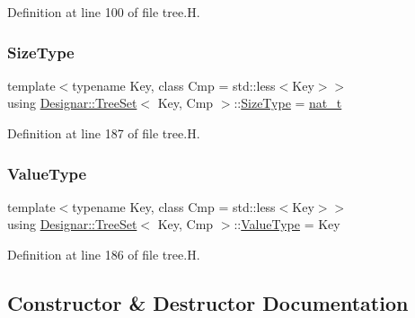 Definition at line 100 of file tree.\+H.

\mbox{\label{class_designar_1_1_tree_set_a9a4926aa5faab169012a173c8cf5e4bb}} 
\subsubsection{\texorpdfstring{Size\+Type}{SizeType}}
{\footnotesize\ttfamily template$<$typename Key, class Cmp = std\+::less$<$\+Key$>$$>$ \\
using \hyperlink{class_designar_1_1_tree_set}{Designar\+::\+Tree\+Set}$<$ Key, Cmp $>$\+::\hyperlink{class_designar_1_1_tree_set_a9a4926aa5faab169012a173c8cf5e4bb}{Size\+Type} =  \hyperlink{namespace_designar_aa72662848b9f4815e7bf31a7cf3e33d1}{nat\+\_\+t}}



Definition at line 187 of file tree.\+H.

\mbox{\label{class_designar_1_1_tree_set_ab913d8de65b88abb61139cc3880ffe2d}} 
\subsubsection{\texorpdfstring{Value\+Type}{ValueType}}
{\footnotesize\ttfamily template$<$typename Key, class Cmp = std\+::less$<$\+Key$>$$>$ \\
using \hyperlink{class_designar_1_1_tree_set}{Designar\+::\+Tree\+Set}$<$ Key, Cmp $>$\+::\hyperlink{class_designar_1_1_tree_set_ab913d8de65b88abb61139cc3880ffe2d}{Value\+Type} =  Key}



Definition at line 186 of file tree.\+H.



\subsection{Constructor \& Destructor Documentation}
\mbox{\label{class_designar_1_1_tree_set_a188c4a4093595878dba7e38b249cb024}} 
